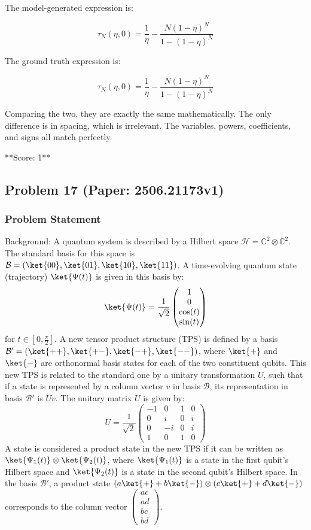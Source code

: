 \documentclass[10pt]{article}
\begin{document}
The model-generated expression is:

\[
\tau_N(\eta,0) = \frac{1}{\eta} - \frac{N(1-\eta)^N}{1-(1-\eta)^N}
\]

The ground truth expression is:

\[
\tau_N(\eta,0) = \frac{1}{\eta} - \frac{N (1-\eta)^N}{1-(1-\eta)^N}
\]

Comparing the two, they are exactly the same mathematically. The only difference is in spacing, which is irrelevant. The variables, powers, coefficients, and signs all match perfectly.

**Score: 1**

\newpage
\subsection*{Problem 17 (Paper: 2506.21173v1)}
\subsubsection*{Problem Statement}
Background:
A quantum system is described by a Hilbert space $\mathcal{H} = \mathbb{C}^2 \otimes \mathbb{C}^2$. The standard basis for this space is $\mathcal{B} = (\ket{00}, \ket{01}, \ket{10}, \ket{11})$. A time-evolving quantum state (trajectory) $\ket{\Psi(t)}$ is given in this basis by:
$$ \ket{\Psi(t)} = \frac{1}{\sqrt{2}} \begin{pmatrix} 1 \\ 0 \\ \cos(t) \\ \sin(t) \end{pmatrix} $$
for $t \in [0, \frac{\pi}{2}]$.
A new tensor product structure (TPS) is defined by a basis $\mathcal{B}' = (\ket{++}, \ket{+-}, \ket{-+}, \ket{--})$, where $\ket{+}$ and $\ket{-}$ are orthonormal basis states for each of the two constituent qubits. This new TPS is related to the standard one by a unitary transformation $U$, such that if a state is represented by a column vector $v$ in basis $\mathcal{B}$, its representation in basis $\mathcal{B}'$ is $Uv$. The unitary matrix $U$ is given by:
$$U = \frac{1}{\sqrt{2}} \begin{pmatrix} -1 & 0 & 1 & 0 \\ 0 & i & 0 & i \\ 0 & -i & 0 & i \\ 1 & 0 & 1 & 0 \end{pmatrix}$$
A state is considered a product state in the new TPS if it can be written as $\ket{\Psi_1(t)} \otimes \ket{\Psi_2(t)}$, where $\ket{\Psi_1(t)}$ is a state in the first qubit's Hilbert space and $\ket{\Psi_2(t)}$ is a state in the second qubit's Hilbert space. In the basis $\mathcal{B}'$, a product state $(a\ket{+} + b\ket{-}) \otimes(c\ket{+} + d\ket{-})$ corresponds to the column vector $\begin{pmatrix} ac \\ ad \\ bc \\ bd \end{pmatrix}$.
\end{document}
